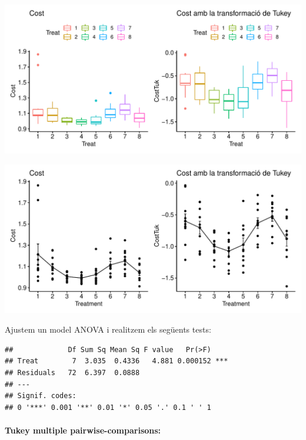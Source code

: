 \documentclass[11pt,a4paper]{article}\usepackage[]{graphicx}\usepackage[]{color}
\makeatletter
\def\maxwidth{ %
  \ifdim\Gin@nat@width>\linewidth
    \linewidth
  \else
    \Gin@nat@width
  \fi
}
\newenvironment{kframe}{%
 \def\at@end@of@kframe{}%
 \ifinner\ifhmode%
  \def\at@end@of@kframe{\end{minipage}}%
  \begin{minipage}{\columnwidth}%
 \fi\fi%
 \def\FrameCommand##1{\hskip\@totalleftmargin \hskip-\fboxsep
 \colorbox{shadecolor}{##1}\hskip-\fboxsep
     \hskip-\linewidth \hskip-\@totalleftmargin \hskip\columnwidth}%
 \MakeFramed {\advance\hsize-\width
   \@totalleftmargin\z@ \linewidth\hsize
   \@setminipage}}%
 {\par\unskip\endMakeFramed%
 \at@end@of@kframe}
\newenvironment{knitrout}{}{} %
\makeatother
\begin{document}
\begin{knitrout}
\color{fgcolor}
\includegraphics[width=\maxwidth]{figure/unnamed-chunk-18-1} 

\includegraphics[width=\maxwidth]{figure/unnamed-chunk-18-2} 

\end{knitrout}

Ajustem un model ANOVA i realitzem els següents tests:
\begin{knitrout}
\color{fgcolor}\begin{kframe}
\begin{verbatim}
##             Df Sum Sq Mean Sq F value   Pr(>F)    
## Treat        7  3.035  0.4336   4.881 0.000152 ***
## Residuals   72  6.397  0.0888                     
## ---
## Signif. codes:  
## 0 '***' 0.001 '**' 0.01 '*' 0.05 '.' 0.1 ' ' 1
\end{verbatim}
\end{kframe}
\end{knitrout}


\paragraph{Tukey multiple pairwise-comparisons:}
\end{document}
